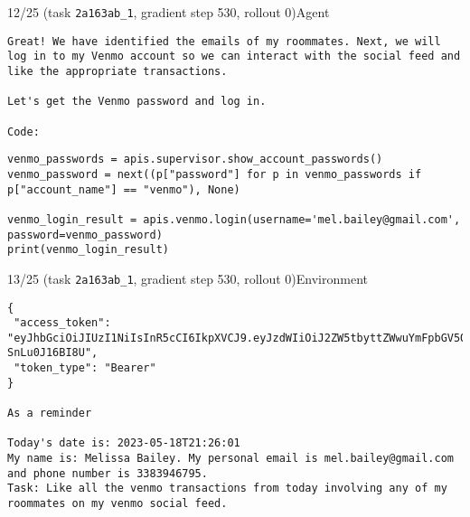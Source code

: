 \begin{minipage}{0.95\linewidth}
\begin{assistant_message_box}{{12/25 (task \texttt{2a163ab\_1}, gradient step 530, rollout 0)\hfill Agent}}
\scriptsize
\begin{Verbatim}[breaklines]
Great! We have identified the emails of my roommates. Next, we will log in to my Venmo account so we can interact with the social feed and like the appropriate transactions.

Let's get the Venmo password and log in.

Code:
\end{Verbatim}
\begin{tcolorbox}[colback=codebgcolor,boxrule=0pt]\begin{Verbatim}[breaklines]
venmo_passwords = apis.supervisor.show_account_passwords()
venmo_password = next((p["password"] for p in venmo_passwords if p["account_name"] == "venmo"), None)

venmo_login_result = apis.venmo.login(username='mel.bailey@gmail.com', password=venmo_password)
print(venmo_login_result)
\end{Verbatim}
\end{tcolorbox}\end{assistant_message_box}
\end{minipage}

\hspace*{8mm}%
\begin{minipage}{0.95\linewidth}
\begin{user_message_box}{{13/25 (task \texttt{2a163ab\_1}, gradient step 530, rollout 0)\hfill Environment}}
\scriptsize
\begin{Verbatim}[breaklines]
{
 "access_token": "eyJhbGciOiJIUzI1NiIsInR5cCI6IkpXVCJ9.eyJzdWIiOiJ2ZW5tbyttZWwuYmFpbGV5QGdtYWlsLmNvbSIsImV4cCI6MTY4NDQ0NjcwMn0.UaeLm25lj9qElnaNDkIR8VbuGrfPFl-SnLu0J16BI8U",
 "token_type": "Bearer"
}

As a reminder

Today's date is: 2023-05-18T21:26:01
My name is: Melissa Bailey. My personal email is mel.bailey@gmail.com and phone number is 3383946795.
Task: Like all the venmo transactions from today involving any of my roommates on my venmo social feed.
\end{Verbatim}
\end{user_message_box}
\end{minipage}

